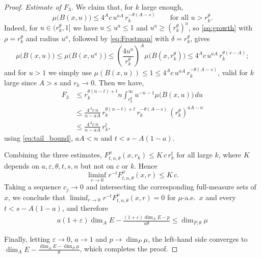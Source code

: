 \documentclass[10pt,a4paper]{amsart}
\begin{document}
\begin{proof}
\emph{Estimate of $F_3$.} We claim that, for $k$ large enough,
\begin{equation}\label{eq:tail_bound}
\mu\bigl(B(x,u)\bigr)\leq 4^{A}c\,u^{aA}\,r_k^{-\theta(A-s)}
\qquad\text{for all }u>r_k^{\theta}.
\end{equation}
Indeed, for $u\in(r_k^{\theta},1]$ we have $u\leq u^{a}\leq 1$ and
$u^{a}\geq(r_k^{\theta})^{a}$, so \eqref{eq:growth} with $\rho=r_k^{\theta}$
and radius $u^{a}$, followed by \eqref{eq:Frostman} with
$\delta=r_k^{\theta}$, gives
$$\mu\bigl(B(x,u)\bigr)\leq\mu\bigl(B(x,u^{a})\bigr)
\leq\left(\frac{4u^{a}}{r_k^{\theta}}\right)^{A}
\mu\bigl(B(x,r_k^{\theta})\bigr)
\leq 4^{A}c\,u^{aA}\,r_k^{\theta(s-A)};$$
and for $u>1$ we simply use $\mu(B(x,u))\leq 1\leq 4^{A}c\,u^{aA}\,
r_k^{-\theta(A-s)}$, valid for $k$ large since $A>s$ and $r_k\to 0$.
Then we have,
\begin{align*}
    F_3&\leq r_k^{\theta(n-t)+t} n\int_{r_k^{\theta}}^{\infty}
u^{-n-1}\mu\bigl(B(x,u)\bigr)\,du\\
&\leq \frac{4^{A}c\,n}{n-aA}\,r_k^{\theta(n-t)+t}\,
r_k^{-\theta(A-s)}\,(r_k^{\theta})^{aA-n}\\
&\leq \frac{4^{A}c\,n}{n-aA}\,r_k^{t},
\end{align*}
using \eqref{eq:tail_bound}, $aA<n$ and $t<s-A(1-a)$.

Combining the three estimates,
$F_{t,n,\theta}^{\mu}(x,r_k)\leq K\,c\,r_k^{t}$ for all large $k$, where
$K$ depends on $a,\varepsilon,\theta,t,s,n$ but not on $c$ or $k$. Hence
$$\liminf_{r\to 0}r^{-t}F_{t,n,\theta}^{\mu}(x,r)\leq K\,c.$$
Taking a sequence $c_j\to 0$ and intersecting the corresponding
full-measure sets of $x$, we conclude that
$\liminf_{r\to 0}r^{-t}F_{t,n,\theta}^{\mu}(x,r)=0$ for $\mu$-a.e.\ $x$
and every $t<s-A(1-a)$, and therefore
\begin{align*}
 a(1+\varepsilon)\dim_A E-\frac{(1+\varepsilon)\dim_A E-p}{a\theta}
\leq \dim_{P,\theta}\mu\end{align*}


Finally, letting $\varepsilon\to 0$, $a\to 1$ and $p\to\dim_P\mu$, the left-hand side
converges to $\dim_A E-\frac{\dim_A E-\dim_P\mu}{\theta}$, which
completes the proof.
\end{proof}
\end{document}

